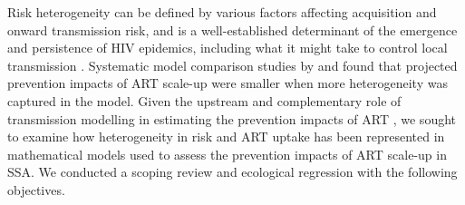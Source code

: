 \par
Risk heterogeneity can be defined by various factors affecting acquisition and onward transmission risk,
and is a well-established determinant of the emergence and persistence of HIV epidemics, including 
what it might take to control local transmission \cite{Anderson1986,Boily1997}.
Systematic model comparison studies by \citet{Hontelez2013} and \citet{Rozhnova2016}
found that projected prevention impacts of ART scale-up were smaller when more heterogeneity was captured in the model.
Given the upstream and complementary role of transmission modelling
in estimating the prevention impacts of ART \cite{Eaton2012,Delva2012},
we sought to examine how heterogeneity in risk and ART uptake has been represented
in mathematical models used to assess the prevention impacts of ART scale-up in SSA. %
We conducted a scoping review and ecological regression with the following objectives.

